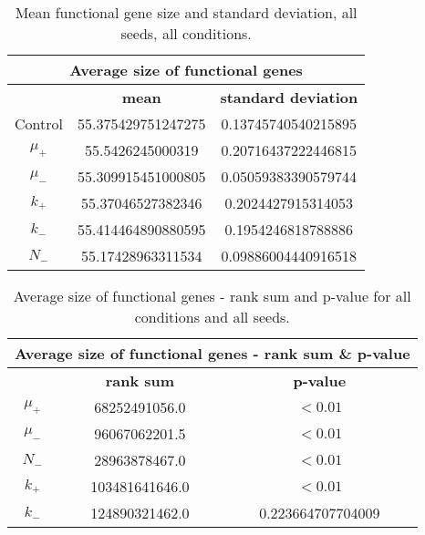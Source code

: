 \begin{table}[H]
	\centering
	\begin{tabular}{|c|c|c|}
		\hline
		\multicolumn{3}{c}{\Large \textbf{Average size of functional genes}} \\
		\hline
		& \textbf{mean} & \textbf{standard deviation} \\
		\hline
		Control & 55.375429751247275 & 0.13745740540215895 \\
		\hline
		$\mu_+$ & 55.5426245000319 & 0.20716437222446815\\ 
		\hline
		$\mu_-$ & 55.309915451000805 & 0.05059383390579744 \\
		\hline
		$k_+$ & 55.37046527382346 & 0.2024427915314053 \\
		\hline
		$k_-$ & 55.414464890880595 & 0.1954246818788886 \\
		\hline
		$N_-$ & 55.17428963311534	& 0.09886004440916518 \\
		\hline
	\end{tabular}
	\caption[Mean functional gene size and standard deviation]{Mean functional gene size and standard deviation, all seeds, all conditions.}
	\label{table:mean_functional_gene_size_and_std_dev}
\end{table}

\begin{table}[H]
	\begin{tabular}{|c|c|c|}
		\hline
		\multicolumn{3}{c}{\Large \textbf{Average size of functional genes - rank sum \& p-value}} \\
		\hline
		& \textbf{rank sum} & \textbf{p-value} \\
		\hline
		$\mu_+$ & 68252491056.0 & $ < 0.01$ \\
		\hline
		$\mu_-$ & 96067062201.5 & $ < 0.01$ \\
		\hline
		$N_-$ & 28963878467.0 & $ < 0.01$ \\
		\hline
		$k_+$ & 103481641646.0 & $ < 0.01$ \\
		\hline
		$k_-$ & 124890321462.0 & 0.223664707704009 \\
		\hline
	\end{tabular}
	\caption[Average size of functional genes - rank sum and p-value]{Average size of functional genes - rank sum and p-value for all conditions and all seeds.}
	\label{table:avg_size_of_functional_genes_rank_sum_and_p-value}
\end{table}

